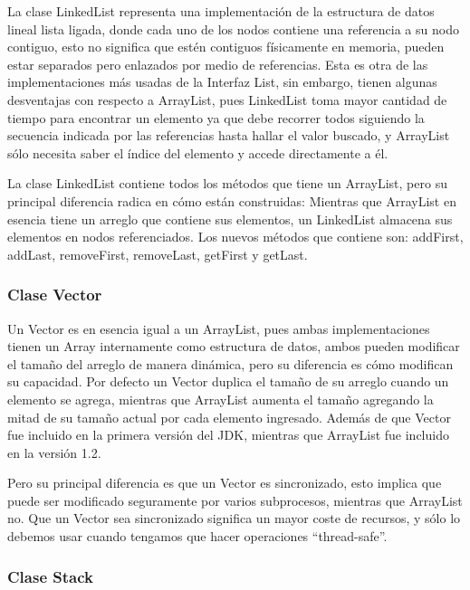 \documentclass[11pt]{article}
\begin{document}
La clase LinkedList representa una implementación de la estructura de 
datos lineal lista ligada, donde cada uno de los nodos contiene una 
referencia a su nodo contiguo, esto no significa que estén contiguos 
físicamente en memoria, pueden estar separados pero enlazados por 
medio de referencias. Esta es otra de las implementaciones más usadas 
de la Interfaz List, sin embargo, tienen algunas desventajas con 
respecto a ArrayList, pues LinkedList toma mayor cantidad de tiempo 
para encontrar un elemento ya que debe recorrer todos siguiendo la 
secuencia indicada por las referencias hasta hallar el valor buscado, 
y ArrayList sólo necesita saber el índice del elemento y accede 
directamente a él. 
\par

La clase LinkedList contiene todos los métodos que tiene un 
ArrayList, pero su principal diferencia radica en cómo están 
construidas: Mientras que ArrayList en esencia tiene un arreglo que 
contiene sus elementos, un LinkedList almacena sus elementos en nodos 
referenciados. Los nuevos métodos que contiene son: addFirst, 
addLast, removeFirst, removeLast, getFirst y getLast.

\subsubsection{Clase Vector}
\par

Un Vector es en esencia igual a un ArrayList, pues ambas 
implementaciones tienen un Array internamente como estructura de 
datos, ambos pueden modificar el tamaño del arreglo de manera 
dinámica, pero su diferencia es cómo modifican su capacidad. Por 
defecto un Vector duplica el tamaño de su arreglo cuando un elemento 
se agrega, mientras que ArrayList aumenta el tamaño agregando la 
mitad de su tamaño actual por cada elemento ingresado. Además de que 
Vector fue incluido en la primera versión del JDK, mientras que 
ArrayList fue incluido en la versión 1.2. 
\par

Pero su principal diferencia es que un Vector es sincronizado, esto 
implica que puede ser modificado seguramente por varios subprocesos, 
mientras que ArrayList no. Que un Vector sea sincronizado significa 
un mayor coste de recursos, y sólo lo debemos usar cuando tengamos 
que hacer operaciones “thread-safe”.

\subsubsection{Clase Stack}
\par
\end{document}
